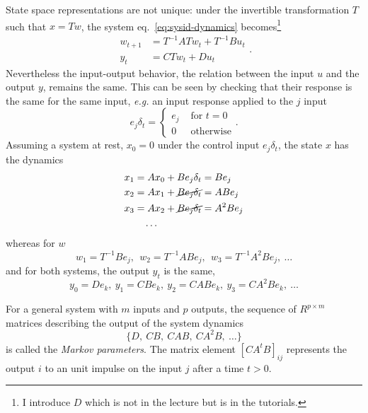State space representations are not unique: under the invertible transformation $T$ such that $x=Tw$, the system eq.~\eqref{eq:sysid-dynamics} becomes\footnote{I introduce $D$ which is not in the lecture but is in the tutorials.}
\begin{equation*}
  \begin{aligned}
    w_{t+1} &= T^{-1}ATw_t + T^{-1}Bu_t \\
    y_t &= CTw_t + Du_t
  \end{aligned}.
\end{equation*}
Nevertheless the input-output behavior, the relation between the input $u$ and the output $y$, remains the same. This can be seen by checking that their response is the same for the same input, \textit{e.g.} an input response applied to the $j$ input
\begin{equation*}
  e_j\delta_t =
  \begin{cases}
    e_j & \text{ for } t=0 \\
    0 & \text{ otherwise}
  \end{cases}.
\end{equation*}
Assuming a system at rest, $x_0=0$ under the control input $e_j\delta_t$, the state $x$ has the dynamics
\begin{equation*}
  \begin{aligned}
    &x_1 = Ax_0+Be_j\delta_t = Be_j \\
    &x_2 = Ax_1+\cancel{Be_j\delta_t} = ABe_j \\
    &x_3 = Ax_2+\cancel{Be_j\delta_t} = A^2Be_j \\
    &\hspace{2em}\ldots
  \end{aligned}
\end{equation*}
whereas for $w$
\begin{equation*}
  w_1=T^{-1}Be_j,\ \ w_2=T^{-1}ABe_j,\ \ w_3=T^{-1}A^2Be_j,\ \ldots
\end{equation*}
and for both systems, the output $y_t$ is the same,
\begin{equation*}
  y_0=De_k,\ y_1=CBe_k,\ y_2=CABe_k,\ y_3=CA^2Be_k,\ \ldots
\end{equation*}

For a general system with $m$ inputs and $p$ outputs, the sequence of $R^{p\times m}$ matrices describing the output of the system dynamics
\begin{equation}
  \label{eq:markov-parameters}
  \{D,\ CB,\ CAB,\ CA^2B,\ \ldots\}
\end{equation}
is called the \emph{Markov parameters}. The matrix element $\left[CA^tB\right]_{ij}$ represents the output $i$ to an unit impulse on the input $j$ after a time $t>0$.

